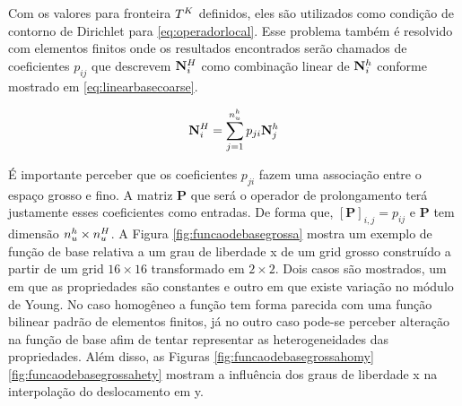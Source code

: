 Com os valores para  fronteira $\coarseelement$  definidos, eles são utilizados como condição de contorno de Dirichlet para \eqref{eq:operadorlocal}. Esse problema também é resolvido com elementos finitos onde os resultados encontrados serão chamados de coeficientes $p_{ij}$ que descrevem $\basefunctioncoarse$ como combinação linear de $\basefunctionfine$ conforme mostrado em \eqref{eq:linearbasecoarse}. 


\begin{equation} \label{eq:linearbasecoarse}
    \basefunctioncoarse = \sum_{j=1}^{\qtdfreedomfine} p_{ji} \basefunctionfine[j]
\end{equation}


É importante perceber que os coeficientes $p_{ji}$ fazem uma associação entre o espaço grosso e fino. A matriz $\mathbf{P}$ que será o operador de prolongamento terá justamente esses coeficientes como entradas. De forma que, $[\mathbf{P}]_{i,j} = p_{ij}$ e $\mathbf{P}$ tem dimensão $\qtdfreedomfine \times \qtdfreedomcoarse$. A Figura \ref{fig:funcaodebasegrossa} mostra um exemplo de função de base relativa a um grau de liberdade x de um grid grosso construído a partir de um grid $16\times16$ transformado em  $2\times2$. Dois casos são mostrados, um em que as propriedades são constantes e outro em que existe variação no módulo de Young. No caso homogêneo a função tem forma parecida com uma função bilinear padrão de elementos finitos, já no outro caso pode-se perceber alteração na função de base afim de tentar representar as heterogeneidades das propriedades. Além disso, as Figuras \ref{fig:funcaodebasegrossahomy} \ref{fig:funcaodebasegrossahety} mostram a influência dos graus de liberdade x na interpolação do deslocamento em y.



